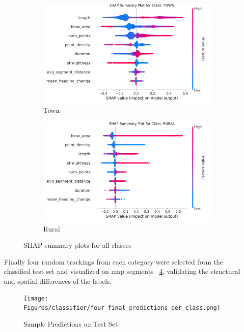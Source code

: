 \documentclass[a4paper,12pt,twoside]{scrreprt}
\begin{document}
\begin{figure}[p]
\begin{subfigure}[b]{0.495\textwidth}
    \includegraphics[width=\textwidth]{Figures/classifier/shap/shap_summary_for_TOWN.png}
    \caption{Town}
    \label{fig:shap_town}
  \end{subfigure}
  \hfill
  \begin{subfigure}[b]{0.495\textwidth}
    \centering

    \includegraphics[width=\textwidth]{Figures/classifier/shap/shap_summary_for_RURAL.png}
    \caption{Rural}
    \label{fig:shap_rural}
  \end{subfigure}

  \caption{SHAP summary plots for all classes}
  \label{fig:shap_all_classes}
\end{figure}

Finally four random trackings from each category were selected from the
classified test set and visualized on map segments
~\ref{fig:four_final_predictions_on_testset}, validating the structural and
spatial differences of the labels.

\begin{figure}[htbp]
  \centering

  \texttt{[image: Figures/classifier/four\_final\_predictions\_per\_class.png]}
  \caption{Sample Predictions on Test Set}
  \label{fig:four_final_predictions_on_testset}
\end{figure}
\FloatBarrier
\end{document}
